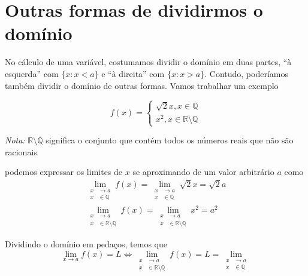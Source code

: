 \documentclass[
  letterpaper,
  DIV=11,
  numbers=noendperiod]{scrreprt}
\begin{document}
\section{Outras formas de dividirmos o
domínio}\label{outras-formas-de-dividirmos-o-domuxednio}

No cálculo de uma variável, costumamos dividir o domínio em duas partes,
``à esquerda'' com \(\{x: x < a\}\) e ``à direita'' com
\(\{x : x > a \}\). Contudo, poderíamos também dividir o domínio de
outras formas. Vamos trabalhar um exemplo

\[
f(x) = \begin{cases}
\sqrt{2}x, x \in \mathbb{Q} \\
x^2, x \in \mathbb{R} \setminus \mathbb{Q}
\end{cases}
\]

\emph{Nota:} \(\mathbb{R} \setminus \mathbb{Q}\) significa o conjunto
que contém todos os números reais que não são racionais

podemos expressar os limites de \(x\) se aproximando de um valor
arbitrário \(a\) como \[
\begin{aligned}
\lim_{\begin{aligned}x&\rightarrow a \\ x& \in\mathbb{Q}\end{aligned}} f(x) =
\lim_{\begin{aligned}x&\rightarrow a \\ x& \in\mathbb{Q}\end{aligned}} \sqrt{2} x=
\sqrt{2} a \\
\lim_{\begin{aligned}x&\rightarrow a \\ x& \in \mathbb{R}\setminus\mathbb{Q}
\end{aligned}} f(x) =
\lim_{\begin{aligned}x&\rightarrow a \\ x& \in\mathbb{R}\setminus\mathbb{Q}
\end{aligned}} x^2 = a^2
\end{aligned}
\]

Dividindo o domínio em pedaços, temos que \[
\lim_{x\rightarrow a} f(x) = L \Leftrightarrow
\lim_{\begin{aligned}x&\rightarrow a \\ x& \in\mathbb{R}\setminus\mathbb{Q}
\end{aligned}} f(x) = L = 
\lim_{\begin{aligned}x&\rightarrow a \\ x& \in\mathbb{Q}\end{aligned}}
\]
\end{document}
